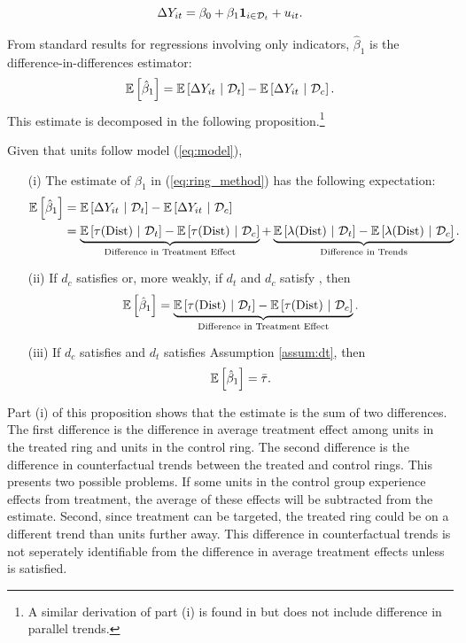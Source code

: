 \documentclass[10pt]{article}
\newcommand{\dist}{\text{Dist}}
\begin{document}
\begin{equation}\label{eq:ring_method}
    \Delta Y_{it} = \beta_0 + \beta_1 \mathbf{1}_{i \in \mathcal{D}_t} + u_{it}.
\end{equation}

From standard results for regressions involving only indicators, $\hat{\beta}_1$ is the difference-in-differences estimator:
\[
    \mathbb{E}\left[\hat{\beta}_1\right] = \mathbb{E}\left[\Delta Y_{it} \ \vert \ \mathcal{D}_t\right] - \mathbb{E}\left[\Delta Y_{it} \ \vert \ \mathcal{D}_c\right].
\]
This estimate is decomposed in the following proposition.\footnote{A similar derivation of part (i) is found in \citet{Sullivan_2017} but does not include difference in parallel trends.}

\begin{proposition}\label{prop:ring_decomp}  
    Given that units follow model (\ref{eq:model}),
    \begin{enumerate}
        \item[(i)] The estimate of $\beta_1$ in (\ref{eq:ring_method}) has the following expectation:
        \begin{align*}
            \expec{\hat{\beta}_1} &= \condexpec{\Delta Y_{it}}{\mathcal{D}_t} - \condexpec{\Delta Y_{it}}{\mathcal{D}_c} \\
            &=  \underbrace{\condexpec{\tau(\dist)}{\mathcal{D}_t} - \condexpec{\tau(\dist)}{\mathcal{D}_c} }_{\text{Difference in Treatment Effect}} + \underbrace{\condexpec{\lambda(\dist)}{\mathcal{D}_t} - \condexpec{\lambda(\dist)}{\mathcal{D}_c} }_{\text{Difference in Trends}}.
        \end{align*}
        
        \item[(ii)] If $d_c$ satisfies  or, more weakly, if $d_t$ and $d_c$ satisfy , then
        \[ 
            \expec{\hat{\beta}_1} = 
            \underbrace{\condexpec{\tau(\dist)}{\mathcal{D}_t} - \condexpec{\tau(\dist)}{\mathcal{D}_c} }_{\text{Difference in Treatment Effect}}.
        \] 
    
        \item[(iii)] If $d_c$ satisfies  and $d_t$ satisfies Assumption \ref{assum:dt}, then
        \[ 
            \mathbb{E}\left[\hat{\beta}_1\right] = \bar{\tau}.
        \]
    \end{enumerate}
\end{proposition}

Part (i) of this proposition shows that the estimate is the sum of two differences. The first difference is the difference in average treatment effect among units in the treated ring and units in the control ring. The second difference is the difference in counterfactual trends between the treated and control rings. This presents two possible problems. If some units in the control group experience effects from treatment, the average of these effects will be subtracted from the estimate. Second, since treatment can be targeted, the treated ring could be on a different trend than units further away. This difference in counterfactual trends is not seperately identifiable from the difference in average treatment effects unless  is satisfied. 
\end{document}
